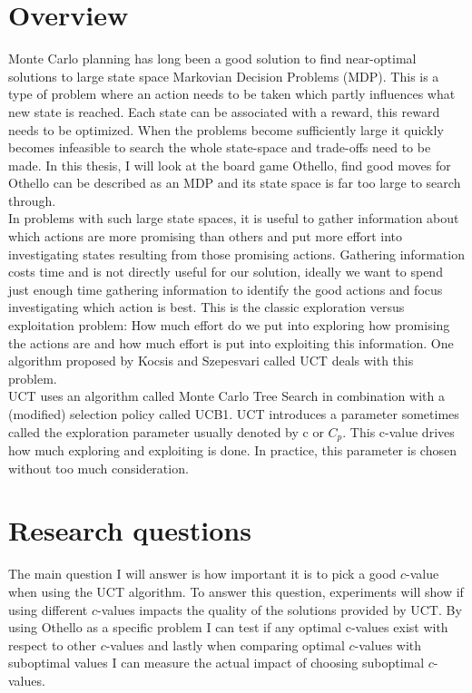 \documentclass[
11pt, %
english, %
singlespacing, %
headsepline, %
]{MastersDoctoralThesis} %
\begin{document}
\section{Overview}
Monte Carlo planning has long been a good solution to find near-optimal solutions to large state space Markovian Decision Problems (MDP). This is a type of problem where an action needs to be taken which partly influences what new state is reached. Each state can be associated with a reward, this reward needs to be optimized. When the problems become sufficiently large it quickly becomes infeasible to search the whole state-space and trade-offs need to be made. In this thesis, I will look at the board game Othello, find good moves for Othello can be described as an MDP and its state space is far too large to search through.\\

In problems with such large state spaces, it is useful to gather information about which actions are more promising than others and put more effort into investigating states resulting from those promising actions. Gathering information costs time and is not directly useful for our solution, ideally we want to spend just enough time gathering information to identify the good actions and focus investigating which action is best. This is the classic exploration versus exploitation problem: How much effort do we put into exploring how promising the actions are and how much effort is put into exploiting this information. One algorithm proposed by Kocsis and Szepesvari\cite{Kocsis:2006} called UCT deals with this problem.\\

UCT uses an algorithm called Monte Carlo Tree Search in combination with a (modified)  selection policy called UCB1. UCT introduces a parameter sometimes called the exploration parameter usually denoted by c or $C_p$. This c-value drives how much exploring and exploiting is done. In practice, this parameter is chosen without too much consideration.\\

\section{Research questions}
\label{section:research-questions}
The main question I will answer is how important it is to pick a good $c$-value when using the UCT algorithm. To answer this question, experiments will show if using different $c$-values impacts the quality of the solutions provided by UCT. By using Othello as a specific problem I can test if any optimal c-values exist with respect to other $c$-values and lastly when comparing optimal $c$-values with suboptimal values I can measure the actual impact of choosing suboptimal $c$-values.\\
\end{document}

